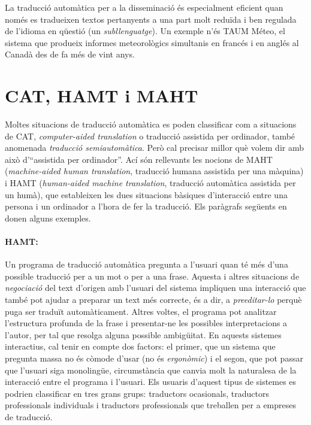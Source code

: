 La traducció automàtica per a la disseminació és especialment eficient
quan només es tradueixen textos pertanyents a una part molt reduïda i
ben regulada de l'idioma en qüestió (un \emph{subllenguatge}).  Un
exemple n'és TAUM Méteo, el sistema que produeix informes
meteorològics simultanis en francés i en anglés al Canadà des de fa
més de vint anys.


\section{CAT, HAMT i MAHT} 
\label{se:cat}

Moltes situacions de traducció
automàtica es poden classificar com a situacions de CAT, {\em
computer-aided translation} o traducció assistida per ordinador,
també anomenada \emph{traducció semiautomàtica}. Però cal
precisar millor què volem dir amb  això d'``assistida per ordinador''. Ací
són rellevants les nocions de MAHT (\emph{machine-aided human
translation}, traducció humana assistida per una màquina) i HAMT
(\emph{human-aided machine translation}, traducció automàtica
assistida per un humà), que estableixen les dues situacions bàsiques
d'interacció
entre una persona i un ordinador a l'hora de fer la traducció. Els
paràgrafs següents en donen alguns exemples.

\paragraph{HAMT:} Un programa de traducció automàtica pregunta a l'usuari
quan té més d'una possible traducció per a un mot o per a una frase.
Aquesta i altres situacions de \emph{negociació} del text d'origen
amb l'usuari del sistema impliquen una interacció que també pot ajudar
a preparar un text més correcte, és a dir, a \emph{preeditar-lo}
perquè puga ser traduït automàticament. Altres voltes, el programa pot
analitzar l'estructura profunda de la frase i presentar-ne les
possibles interpretacions a l'autor, per tal que resolga alguna
possible ambigüitat. En aquests sistemes interactius, cal tenir en
compte dos factors: el primer, que un sistema que pregunta massa no és
còmode d'usar (no és \emph{ergonòmic}) i el segon, que pot passar que
l'usuari siga monolingüe, circumstància que canvia molt la naturalesa
de la interacció entre el programa i l'usuari.  Els usuaris d'aquest
tipus de sistemes es podrien classificar en tres grans grups:
traductors ocasionals, traductors professionals individuals i
traductors professionals que treballen per a empreses de traducció.

